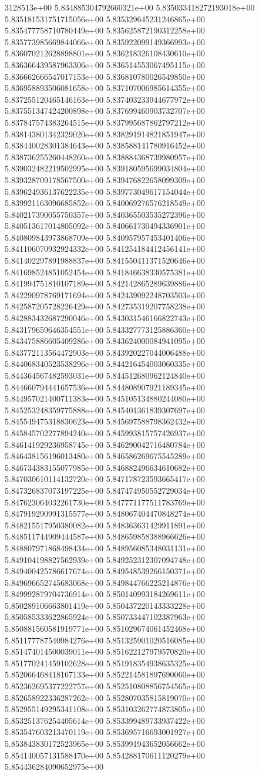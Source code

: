 3128513e+00	5.834885304792660321e+00	5.835033418272193018e+00	5.835181531751715056e+00	5.835329645231246865e+00	5.835477758710780449e+00	5.835625872190312258e+00	5.835773985669844066e+00	5.835922099149366993e+00	5.836070212628898801e+00	5.836218326108430610e+00	5.836366439587963306e+00	5.836514553067495115e+00	5.836662666547017153e+00	5.836810780026549850e+00	5.836958893506081658e+00	5.837107006985614355e+00	5.837255120465146163e+00	5.837403233944677972e+00	5.837551347424200898e+00	5.837699460903732707e+00	5.837847574383264515e+00	5.837995687862797212e+00	5.838143801342329020e+00	5.838291914821851947e+00	5.838440028301384643e+00	5.838588141780916452e+00	5.838736255260448260e+00	5.838884368739980957e+00	5.839032482219502995e+00	5.839180595699034804e+00	5.839328709178567500e+00	5.839476822658099309e+00	5.839624936137622235e+00	5.839773049617154044e+00	5.839921163096685852e+00	5.840069276576218549e+00	5.840217390055750357e+00	5.840365503535272396e+00	5.840513617014805092e+00	5.840661730494336901e+00	5.840809843973868709e+00	5.840957957453401406e+00	5.841106070932924332e+00	5.841254184412456141e+00	5.841402297891988837e+00	5.841550411371520646e+00	5.841698524851052454e+00	5.841846638330575381e+00	5.841994751810107189e+00	5.842142865289639886e+00	5.842290978769171694e+00	5.842439092248703503e+00	5.842587205728226429e+00	5.842735319207758238e+00	5.842883432687290046e+00	5.843031546166822743e+00	5.843179659646354551e+00	5.843327773125886360e+00	5.843475886605409286e+00	5.843624000084941095e+00	5.843772113564472903e+00	5.843920227044006488e+00	5.844068340523538296e+00	5.844216454003060335e+00	5.844364567482593031e+00	5.844512680962124840e+00	5.844660794441657536e+00	5.844808907921189345e+00	5.844957021400711383e+00	5.845105134880244080e+00	5.845253248359775888e+00	5.845401361839307697e+00	5.845549475318830623e+00	5.845697588798362432e+00	5.845845702277894240e+00	5.845993815757426937e+00	5.846141929236958745e+00	5.846290042716480784e+00	5.846438156196013480e+00	5.846586269675545289e+00	5.846734383155077985e+00	5.846882496634610682e+00	5.847030610114132720e+00	5.847178723593665417e+00	5.847326837073197225e+00	5.847474950552729034e+00	5.847623064032261730e+00	5.847771177511783769e+00	5.847919290991315577e+00	5.848067404470848274e+00	5.848215517950380082e+00	5.848363631429911891e+00	5.848511744909444587e+00	5.848659858388966626e+00	5.848807971868498434e+00	5.848956085348031131e+00	5.849104198827562939e+00	5.849252312307094748e+00	5.849400425786617674e+00	5.849548539266150371e+00	5.849696652745683068e+00	5.849844766225214876e+00	5.849992879704736914e+00	5.850140993184269611e+00	5.850289106663801419e+00	5.850437220143333228e+00	5.850585333622865924e+00	5.850733447102387963e+00	5.850881560581919771e+00	5.851029674061452468e+00	5.851177787540984276e+00	5.851325901020516085e+00	5.851474014500039011e+00	5.851622127979570820e+00	5.851770241459102628e+00	5.851918354938635325e+00	5.852066468418167133e+00	5.852214581897690060e+00	5.852362695377222757e+00	5.852510808856754565e+00	5.852658922336287262e+00	5.852807035815819070e+00	5.852955149295341108e+00	5.853103262774873805e+00	5.853251376254405614e+00	5.853399489733937422e+00	5.853547603213470119e+00	5.853695716693001927e+00	5.853843830172523965e+00	5.853991943652056662e+00	5.854140057131588470e+00	5.854288170611120279e+00	5.854436284090652975e+00